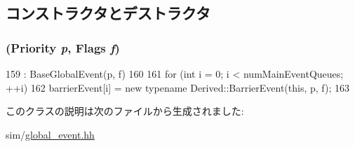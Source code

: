 \subsection{コンストラクタとデストラクタ}
\hypertarget{classBaseGlobalEventTemplate_ad16b63ab345fafbe85063ef44dd46a9a}{
\subsubsection[{BaseGlobalEventTemplate}]{ ({\bf Priority} {\em p}, \/  {\bf Flags} {\em f})}}
\label{classBaseGlobalEventTemplate_ad16b63ab345fafbe85063ef44dd46a9a}



\begin{DoxyCode}
159         : BaseGlobalEvent(p, f)
160     {
161         for (int i = 0; i < numMainEventQueues; ++i)
162             barrierEvent[i] = new typename Derived::BarrierEvent(this, p, f);
163     }
\end{DoxyCode}


このクラスの説明は次のファイルから生成されました:\begin{DoxyCompactItemize}
\item 
sim/\hyperlink{global__event_8hh}{global\_\-event.hh}\end{DoxyCompactItemize}
